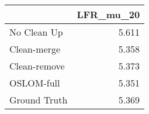\begin{tabular}{lr}
\toprule
{} & LFR_mu_20 \\
\midrule
No Clean Up  &     5.611 \\
Clean-merge  &     5.358 \\
Clean-remove &     5.373 \\
OSLOM-full   &     5.351 \\
Ground Truth &     5.369 \\
\bottomrule
\end{tabular}
